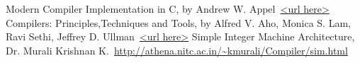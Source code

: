 \cleardoublepage
{}
{}
\begin{thebibliography}{99}

Modern Compiler Implementation in C, by  Andrew W. Appel\ \url{<url here>}
Compilers: Principles,Techniques and Tools, by Alfred V. Aho, Monica S. Lam, Ravi Sethi, Jeffrey D. Ullman\ \url{<url here>}
Simple Integer Machine Architecture, Dr. Murali Krishnan K.\ \url{http://athena.nitc.ac.in/~kmurali/Compiler/sim.html}

\end{thebibliography}
